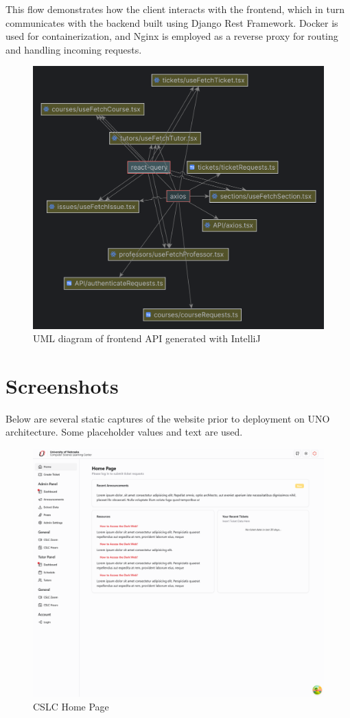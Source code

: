 \documentclass[oneside,openany,obeyspaces]{book}
\newcommand\tab[1][1cm]{\hspace*{#1}}
\begin{document}
\begin{flushleft}
    This flow demonstrates how the client interacts with the frontend, which in turn communicates with the backend built using Django Rest Framework. Docker is used for containerization, and Nginx is employed as a reverse proxy for routing and handling incoming requests.
    \begin{figure}
        \centering
        \includegraphics[width=160mm,scale=0.5]{img/API-uml.png}
        \caption{UML diagram of frontend API generated with IntelliJ}
        \label{fig:UML of frontend API}
    \end{figure}



    \section{Screenshots}

    \tab Below are several static captures of the website prior to deployment on UNO architecture. Some placeholder values and text are used.

    \begin{figure}
        \centering
        \includegraphics[width=0.75\linewidth]{img/Home Page.png}
        \caption{CSLC Home Page}
        \label{fig:Home Page}
    \end{figure}


\end{flushleft}
\end{document}
